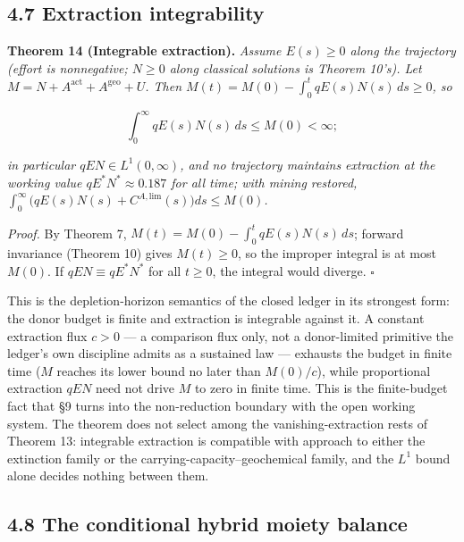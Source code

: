 \documentclass[11pt]{article}
\begin{document}
\subsection*{4.7 Extraction integrability}\label{47-extraction-integrability}

\textbf{Theorem 14 (Integrable extraction).} \emph{Assume \(E(s) \ge 0\) along the trajectory (effort is nonnegative; \(N \ge 0\) along classical solutions is Theorem 10's). Let \(M =\allowbreak{} N +\allowbreak{} A^{\mathrm{act}} +\allowbreak{} A^{\mathrm{geo}} +\allowbreak{} U\). Then \(M(t) =\allowbreak{} M(0) - \int_0^t qE(s)N(s)\,\allowbreak{} ds \ge 0\), so} 

$$\int_0^\infty qE(s)N(s)\, ds \le M(0) < \infty;$$

 \emph{in particular \(qEN \in L^1(0,\infty)\), and no trajectory maintains extraction at the working value \(qE^*N^* \approx 0.187\) for all time; with mining restored, \(\int_0^\infty \bigl( qE(s)N(s) +\allowbreak{} C^{A,\allowbreak{}\mathrm{lim}}(s) \bigr) ds \le M(0)\).}

\emph{Proof.} By Theorem 7, \(M(t) =\allowbreak{} M(0) - \int_0^t qE(s)N(s)\,\allowbreak{} ds\); forward invariance (Theorem 10) gives \(M(t) \ge 0\), so the improper integral is at most \(M(0)\). If \(qEN \equiv qE^*N^*\) for all \(t \ge 0\), the integral would diverge. \(\square\)

This is the depletion-horizon semantics of the closed ledger in its strongest form: the donor budget is finite and extraction is integrable against it. A constant extraction flux \(c>0\) --- a comparison flux only, not a donor-limited primitive the ledger's own discipline admits as a sustained law --- exhausts the budget in finite time (\(M\) reaches its lower bound no later than \(M(0)/c\)), while proportional extraction \(qEN\) need not drive \(M\) to zero in finite time. This is the finite-budget fact that \S9 turns into the non-reduction boundary with the open working system. The theorem does not select among the vanishing-extraction rests of Theorem 13: integrable extraction is compatible with approach to either the extinction family or the carrying-capacity--geochemical family, and the \(L^1\) bound alone decides nothing between them.

\subsection*{4.8 The conditional hybrid moiety balance}\label{48-the-conditional-hybrid-moiety-balance}
\end{document}
